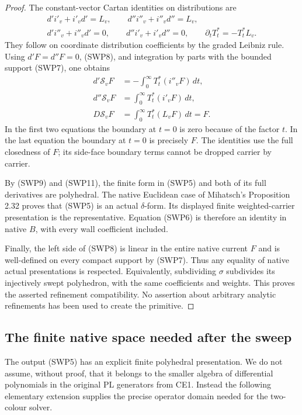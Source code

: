 \begin{proof}
The constant-vector Cartan identities on distributions are
\[
 \begin{gathered}
 d'i'_v+i'_vd'=L_v,\qquad d''i''_v+i''_vd''=L_v,\\
 d'i''_v+i''_vd'=0,\qquad d''i'_v+i'_vd''=0,\qquad
                         \partial_tT_t^*=-T_t^*L_v.
 \end{gathered}
 \tag{SWP10}
\]
They follow on coordinate distribution coefficients by the graded
Leibniz rule.  Using $d'F=d''F=0$, (SWP8), and integration by
parts with the bounded support (SWP7), one obtains
\[
 \begin{split}
 d'\mathcal S_vF&=-\int_0^\infty T_t^*(i''_vF)\,dt,\\
 d''\mathcal S_vF&=\int_0^\infty T_t^*(i'_vF)\,dt,\\
 D\mathcal S_vF&=\int_0^\infty T_t^*(L_vF)\,dt=F.
 \end{split}
 \tag{SWP11}
\]
In the first two equations the boundary at $t=0$ is zero because
of the factor $t$.  In the last equation the boundary at $t=0$
is precisely $F$.  The identities use the full closedness of $F$;
its side-face boundary terms cannot be dropped carrier by carrier.

By (SWP9) and (SWP11), the finite form in (SWP5) and both of its
full derivatives are polyhedral.  The native Euclidean case of
Mihatsch's Proposition 2.32 proves that (SWP5) is an actual
$\delta$-form.  Its displayed finite weighted-carrier presentation
is the representative.  Equation (SWP6) is therefore an identity
in native $B$, with every wall coefficient included.

Finally, the left side of (SWP8) is linear in the entire native
current $F$ and is well-defined on every compact support by (SWP7).
Thus any equality of native actual presentations is respected.
Equivalently, subdividing $\sigma$ subdivides its injectively swept
polyhedron, with the same coefficients and weights.  This proves
the asserted refinement compatibility.  No assertion about arbitrary
analytic refinements has been used to create the primitive.
\end{proof}

\subsection{The finite native space needed after the sweep}

The output (SWP5) has an explicit finite polyhedral presentation.
We do not assume, without proof, that it belongs to the smaller
algebra of differential polynomials in the original PL generators
from CE1.  Instead the following elementary extension supplies the
precise operator domain needed for the two-colour solver.


